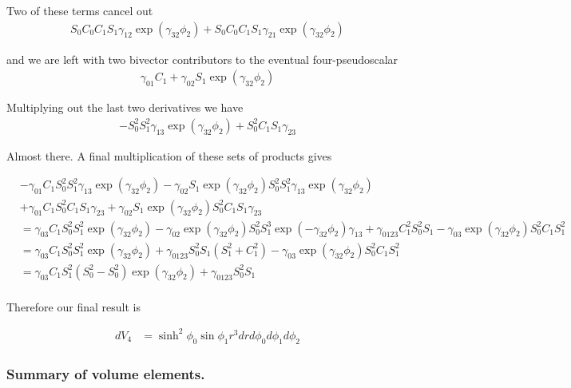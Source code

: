 \documentclass{article}
\begin{document}
Two of these terms cancel out
\begin{align*}
S_0 C_0 C_1 S_1 \gamma_{12} \exp( \gamma_{32} \phi_2 ) 
+S_0 C_0 C_1 S_1 \gamma_{21} \exp( \gamma_{32} \phi_2 ) 
\end{align*}

and we are left with two bivector contributors to the eventual four-pseudoscalar
\begin{align*}
\gamma_{01} C_1 
+\gamma_{02} S_1 \exp( \gamma_{32} \phi_2 ) 
\end{align*}

Multiplying out the last two derivatives we have
\begin{align*}
-S_0^2 S_1^2 \gamma_{13} \exp( \gamma_{32} \phi_2 )
+ S_0^2 C_1 S_1 \gamma_{23}
\end{align*}

Almost there.  A final multiplication of these sets of products gives

\begin{align*}
&-\gamma_{01} C_1 S_0^2 S_1^2 \gamma_{13} \exp( \gamma_{32} \phi_2 )
-\gamma_{02} S_1 \exp( \gamma_{32} \phi_2 ) S_0^2 S_1^2 \gamma_{13} \exp( \gamma_{32} \phi_2 ) \\
&+\gamma_{01} C_1 S_0^2 C_1 S_1 \gamma_{23}
+\gamma_{02} S_1 \exp( \gamma_{32} \phi_2 ) S_0^2 C_1 S_1 \gamma_{23} \\
&=
\gamma_{03} C_1 S_0^2 S_1^2 \exp( \gamma_{32} \phi_2 )
-\gamma_{02} \exp( \gamma_{32} \phi_2 ) S_0^2 S_1^3 \exp( -\gamma_{32} \phi_2 ) \gamma_{13}
+\gamma_{0123} C_1^2 S_0^2 S_1 
-\gamma_{03} \exp( \gamma_{32} \phi_2 ) S_0^2 C_1 S_1^2 \\
&=
\gamma_{03} C_1 S_0^2 S_1^2 \exp( \gamma_{32} \phi_2 )
+\gamma_{0123} S_0^2 S_1 (S_1^2 + C_1^2)
-\gamma_{03} \exp( \gamma_{32} \phi_2 ) S_0^2 C_1 S_1^2 \\
&=
\gamma_{03} C_1 S_1^2 (S_0^2 -S_0^2)\exp( \gamma_{32} \phi_2 )
+\gamma_{0123} S_0^2 S_1  \\
\end{align*}

Therefore our final result is

\begin{align*}
dV_4 &= \sinh^2 \phi_0 \sin\phi_1 r^3 dr d\phi_0 d\phi_1 d\phi_2
\end{align*}

\subsubsection{ Summary of volume elements. }
\end{document}
